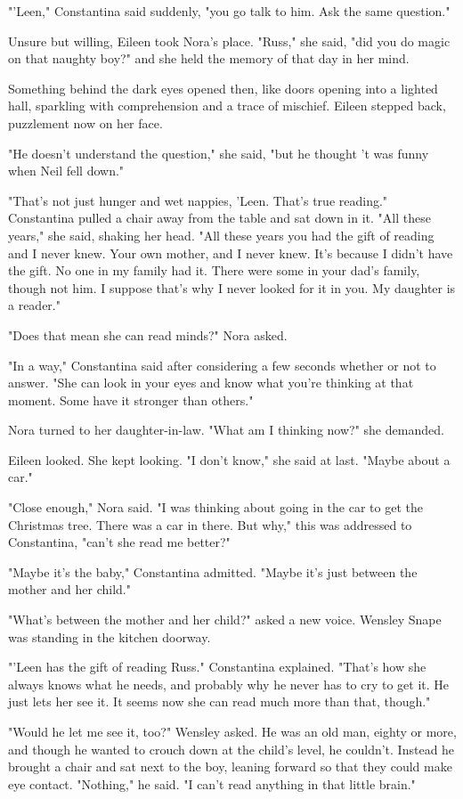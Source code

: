 "'Leen," Constantina said suddenly, "you go talk to him. Ask the same question."

Unsure but willing, Eileen took Nora's place. "Russ," she said, "did you do magic on that naughty boy?" and she held the memory of that day in her mind.

Something behind the dark eyes opened then, like doors opening into a lighted hall, sparkling with comprehension and a trace of mischief. Eileen stepped back, puzzlement now on her face.

"He doesn't understand the question," she said, "but he thought 't was funny when Neil fell down."

"That's not just hunger and wet nappies, 'Leen. That's true reading." Constantina pulled a chair away from the table and sat down in it. "All these years," she said, shaking her head. "All these years you had the gift of reading and I never knew. Your own mother, and I never knew. It's because I didn't have the gift. No one in my family had it. There were some in your dad's family, though not him. I suppose that's why I never looked for it in you. My daughter is a reader."

"Does that mean she can read minds?" Nora asked.

"In a way," Constantina said after considering a few seconds whether or not to answer. "She can look in your eyes and know what you're thinking at that moment. Some have it stronger than others."

Nora turned to her daughter-in-law. "What am I thinking now?" she demanded.

Eileen looked. She kept looking. "I don't know," she said at last. "Maybe about a car."

"Close enough," Nora said. "I was thinking about going in the car to get the Christmas tree. There was a car in there. But why," this was addressed to Constantina, "can't she read me better?"

"Maybe it's the baby," Constantina admitted. "Maybe it's just between the mother and her child."

"What's between the mother and her child?" asked a new voice. Wensley Snape was standing in the kitchen doorway.

"'Leen has the gift of reading Russ." Constantina explained. "That's how she always knows what he needs, and probably why he never has to cry to get it. He just lets her see it. It seems now she can read much more than that, though."

"Would he let me see it, too?" Wensley asked. He was an old man, eighty or more, and though he wanted to crouch down at the child's level, he couldn't. Instead he brought a chair and sat next to the boy, leaning forward so that they could make eye contact. "Nothing," he said. "I can't read anything in that little brain."

